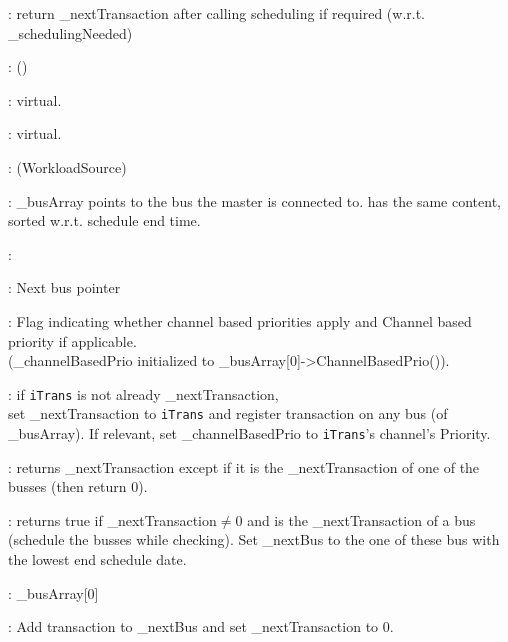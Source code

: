 \documentclass[a4paper,11pt]{article}
\newcommand{\bfont}{\fontseries{b}\selectfont}
\newcommand{\cod}[1]{{\ttfamily #1}}
\newcommand{\class}[2]{\par\vspace{1mm}\hspace{-5mm}\large\colorbox{file}{\textbullet\bfont\cod{#1}:} (\cod{#2})\par}
\newcommand{\method}[1]{\par\vspace{1mm}\hspace{-2mm}\colorbox{method}{\textopenbullet\bfont\cod{#1}:}}
\newcommand{\variable}[1]{\par\vspace{1mm}\hspace{-2mm}\colorbox{variable}{\textopenbullet\bfont\cod{#1}:}}
\begin{document}
\method{getNextTransaction()}
	return \_nextTransaction after calling scheduling if required (w.r.t. \cod{\_schedulingNeeded})
	
\class{Slave}{}

\method{CalcTransactionLength(iTrans)} virtual.

\method{addTransaction(iTrans)} virtual.

\class{BusMaster}{WorkloadSource}

\variable{nbOfBuses, \_busArray, \_busSortArray} \cod{\_busArray} points to the bus the master is connected to. \cod{} has the same content, sorted w.r.t. schedule end time.

\variable{\_nextTransaction}

\variable{\_nextBus} Next bus pointer

\variable{\_channelBasedPrioEnabled, \_channelBasedPrio} Flag indicating whether channel based priorities apply and Channel based priority if applicable.\\ (\cod{\_channelBasedPrio} initialized to \cod{\_busArray[0]->ChannelBasedPrio()}).

\method{registerTransaction(iTrans)} if {\tt iTrans} is not already \cod{\_nextTransaction},\\ set \cod{\_nextTransaction} to {\tt iTrans} and register transaction on any bus (of \cod{\_busArray}). If relevant, set \cod{\_channelBasedPrio} to {\tt iTrans}'s channel's Priority.

\method{getNextTransaction(iEndSchedule)} returns \cod{\_nextTransaction} except if it is the \cod{\_nextTransaction} of one of the busses (then return 0).

\method{accessGranted()} returns true if \cod{\_nextTransaction}$\neq$0 and is the \cod{\_nextTransaction} of a bus (schedule the busses while checking). Set \cod{\_nextBus} to the one of these bus with the lowest end schedule date. 

\method{getBus()} \cod{\_busArray[0]}

\method{addTransaction(iTransToBeAdded)} Add transaction to \cod{\_nextBus} and set \cod{\_next\-Tran\-saction} to 0.
\end{document}
